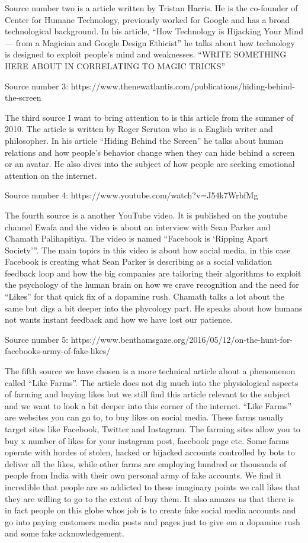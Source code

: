 \documentclass[11pt]{article}
\begin{document}
Source number two is a article written by Tristan Harris. He is the co-founder of Center for Humane Technology, previously worked for Google and has a broad technological background. In his article, “How Technology is Hijacking Your Mind — from a Magician and Google Design Ethicist” he talks about how technology is designed to exploit people's mind and weaknesses. “WRITE SOMETHING HERE ABOUT IN CORRELATING TO MAGIC TRICKS”

Source number 3:
https://www.thenewatlantis.com/publications/hiding-behind-the-screen

The third source I want to bring attention to is this article from the summer of 2010. The article is written by Roger Scruton who is a English writer and philosopher. In his article “Hiding Behind the Screen” he talks about human relations and how people's behavior change when they can hide behind a screen or an avatar. He also dives into the subject of how people are seeking emotional attention on the internet.

Source number 4:
https://www.youtube.com/watch?v=J54k7WrbfMg

The fourth source is a another YouTube video. It is published on the youtube channel Ewafa and the video is about an interview with Sean Parker and Chamath Palihapitiya. The video is named “Facebook is ‘Ripping Apart Society’”. The main topics in this video is about how social media, in this case Facebook is creating what Sean Parker is describing as a social validation feedback loop and how the big companies are tailoring their algorithms to exploit the psychology of the human brain on how we crave recognition and the need for “Likes” for that quick fix of a dopamine rush. Chamath talks a lot about the same but digs a bit deeper into the phycology part. He speaks about how humans not wants instant feedback and how we have lost our patience.

Source number 5: https://www.benthamsgaze.org/2016/05/12/on-the-hunt-for-facebooks-army-of-fake-likes/

The fifth source we have chosen is a more technical article about a phenomenon called “Like Farms”. The article does not dig much into the physiological aspects of farming and buying likes but we still find this article relevant to the subject and we want to look a bit deeper into this corner of the internet. “Like Farms” are websites you can go to, to buy likes on social media. These farms usually target sites like Facebook, Twitter and Instagram. The farming sites allow you to buy x number of likes for your instagram post, facebook page etc. Some farms operate with hordes of stolen, hacked or hijacked accounts controlled by bots to deliver all the likes, while other farms are employing hundred or thousands of people from India with their own personal army of fake accounts. We find it incredible that people are so addicted to these imaginary points we call likes that they are willing to go to the extent of buy them. It also amazes us that there is in fact people on this globe whos job is to create fake social media accounts and go into paying customers media posts and pages just to give em a dopamine rush and some fake acknowledgement.
\end{document}
